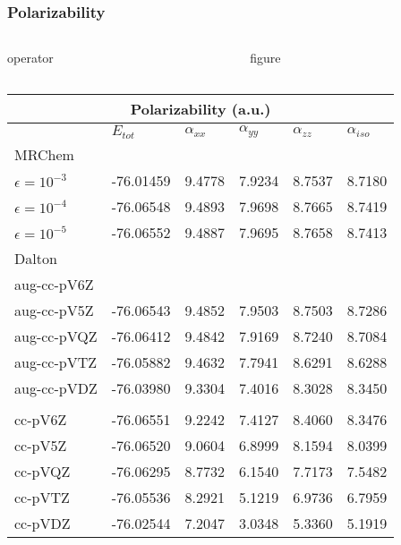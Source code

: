 \begin{frame}
\frametitle{Polarizability}
\begin{columns}

\begin{column}[b]{0.5\textwidth}
\centering
operator
\end{column}

\begin{column}[b]{0.5\textwidth}
\centering
figure
\end{column}

\end{columns}
\vspace{5mm}
\centering
\vspace{5mm}

\begin{table}
\tiny
\centering
\begin{tabular}{l|l|lll|l}
\multicolumn{6}{c}{\textbf{Polarizability (a.u.)}}\\
\hline
\hline
                    &$E_{tot}$  &$\alpha_{xx}$  &$\alpha_{yy}$  
                    &$\alpha_{zz}$  &$\alpha_{iso}$ \\
\hline
MRChem              &          &        &        &        &        \\
$\epsilon=10^{-3}$  &-76.01459 & 9.4778 & 7.9234 & 8.7537 & 8.7180 \\
$\epsilon=10^{-4}$  &-76.06548 & 9.4893 & 7.9698 & 8.7665 & 8.7419 \\
$\epsilon=10^{-5}$  &-76.06552 & 9.4887 & 7.9695 & 8.7658 & 8.7413 \\
\hline
Dalton              &          &        &        &        &        \\
aug-cc-pV6Z         &          &        &        &        &        \\
aug-cc-pV5Z         &-76.06543 & 9.4852 & 7.9503 & 8.7503 & 8.7286 \\
aug-cc-pVQZ         &-76.06412 & 9.4842 & 7.9169 & 8.7240 & 8.7084 \\
aug-cc-pVTZ         &-76.05882 & 9.4632 & 7.7941 & 8.6291 & 8.6288 \\
aug-cc-pVDZ         &-76.03980 & 9.3304 & 7.4016 & 8.3028 & 8.3450 \\
                    &          &        &        &        &        \\
cc-pV6Z             &-76.06551 & 9.2242 & 7.4127 & 8.4060 & 8.3476 \\
cc-pV5Z             &-76.06520 & 9.0604 & 6.8999 & 8.1594 & 8.0399 \\
cc-pVQZ             &-76.06295 & 8.7732 & 6.1540 & 7.7173 & 7.5482 \\
cc-pVTZ             &-76.05536 & 8.2921 & 5.1219 & 6.9736 & 6.7959 \\
cc-pVDZ             &-76.02544 & 7.2047 & 3.0348 & 5.3360 & 5.1919 \\
\hline
\hline
\end{tabular}
\end{table}

\end{frame}


